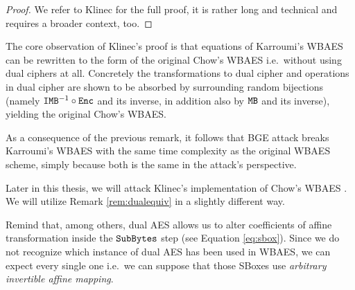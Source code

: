 	\begin{proof}
		We refer to Klinec \cite{klinec2013white} for the full proof, it is rather long and technical and requires a broader context, too.
	\end{proof}
	
	\begin{remark}
	\label{rem:dualequiv}
		The core observation of Klinec's proof is that equations of Karroumi's WBAES can be rewritten to the form of the original Chow's WBAES i.e.\ without using dual ciphers at all. Concretely the transformations to dual cipher and operations in dual cipher are shown to be absorbed by surrounding random bijections (namely $\texttt{IMB}^{-1}\circ\texttt{Enc}$ and its inverse, in addition also by $\texttt{MB}$ and its inverse), yielding the original Chow's WBAES.
	\end{remark}
	
	As a consequence of the previous remark, it follows that BGE attack breaks Karroumi's WBAES with the same time complexity as the original WBAES scheme, simply because both is the same in the attack's perspective.
	
	\begin{note}
	\label{note:dualsbox}
		Later in this thesis, we will attack Klinec's implementation \cite{klinec2013implementation} of Chow's WBAES \cite{chow2002aes}. We will utilize Remark \ref{rem:dualequiv} in a slightly different way.
		
		Remind that, among others, dual AES allows us to alter coefficients of affine transformation inside the $\texttt{SubBytes}$ step (see Equation \ref{eq:sbox}). Since we do not recognize which instance of dual AES has been used in WBAES, we can expect every single one i.e.\ we can suppose that those SBoxes use {\em arbitrary invertible affine mapping}.
	\end{note}
	
